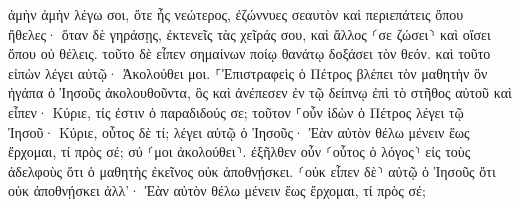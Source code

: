 \documentclass{openreader}
\begin{document}
ἀμὴν ἀμὴν λέγω σοι, ὅτε ἦς νεώτερος, ἐζώννυες σεαυτὸν καὶ περιεπάτεις ὅπου ἤθελες· ὅταν δὲ γηράσῃς, ἐκτενεῖς τὰς χεῖράς σου, καὶ ἄλλος ⸂σε ζώσει⸃ καὶ οἴσει ὅπου οὐ θέλεις. 
τοῦτο δὲ εἶπεν σημαίνων ποίῳ θανάτῳ δοξάσει τὸν θεόν. καὶ τοῦτο εἰπὼν λέγει αὐτῷ· Ἀκολούθει μοι. 
⸀Ἐπιστραφεὶς ὁ Πέτρος βλέπει τὸν μαθητὴν ὃν ἠγάπα ὁ Ἰησοῦς ἀκολουθοῦντα, ὃς καὶ ἀνέπεσεν ἐν τῷ δείπνῳ ἐπὶ τὸ στῆθος αὐτοῦ καὶ εἶπεν· Κύριε, τίς ἐστιν ὁ παραδιδούς σε; 
τοῦτον ⸀οὖν ἰδὼν ὁ Πέτρος λέγει τῷ Ἰησοῦ· Κύριε, οὗτος δὲ τί; 
λέγει αὐτῷ ὁ Ἰησοῦς· Ἐὰν αὐτὸν θέλω μένειν ἕως ἔρχομαι, τί πρὸς σέ; σύ ⸂μοι ἀκολούθει⸃. 
ἐξῆλθεν οὖν ⸂οὗτος ὁ λόγος⸃ εἰς τοὺς ἀδελφοὺς ὅτι ὁ μαθητὴς ἐκεῖνος οὐκ ἀποθνῄσκει. ⸂οὐκ εἶπεν δὲ⸃ αὐτῷ ὁ Ἰησοῦς ὅτι οὐκ ἀποθνῄσκει ἀλλ’· Ἐὰν αὐτὸν θέλω μένειν ἕως ἔρχομαι, τί πρὸς σέ; 
\end{document}
